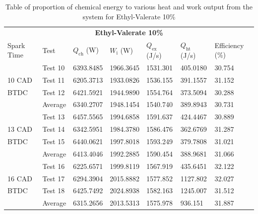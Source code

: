 \documentclass[11pt]{article}
\begin{document}
\begin{table}[H]
	\begin{center}
	\begin{tabular}{@{}l l l l l l l@{}}
		\toprule
		\multicolumn{7}{c}{\textbf{Ethyl-Valerate 10\%}}\\
		Spark Time & Test & $Q_\textrm{ch}$ (W) & $W_\textrm{i}$ (W) & $Q_\textrm{ex}$ (J/s) & $Q_\textrm{ht}$ (J/s) & Efficiency (\%)\\
		\midrule
				& Test 10  & 6393.8485 & 1966.3645 & 1531.301 & 405.0180 & 30.754\\
		10 CAD	& Test 11  & 6205.3713 & 1933.0826 & 1536.155 & 391.1557 & 31.152\\
		BTDC	& Test 12  & 6421.5921 & 1944.9890 & 1554.764 & 373.5094 & 30.288\\
				& Average  & 6340.2707 & 1948.1454 & 1540.740 & 389.8943 & 30.731\\
				& Test 13  & 6457.5565 & 1994.6858 & 1591.637 & 424.4467 & 30.889\\
		13 CAD	& Test 14  & 6342.5951 & 1984.3780 & 1586.476 & 362.6769 & 31.287\\
		BTDC	& Test 15  & 6440.0621 & 1997.8018 & 1593.249 & 379.7808 & 31.021\\
				& Average  & 6413.4046 & 1992.2885 & 1590.454 & 388.9681 & 31.066\\	
				& Test 16  & 6225.6571 & 1999.8119 & 1567.919 & 435.6451 & 32.122\\
		16 CAD	& Test 17  & 6294.3904 & 2015.8882 & 1577.852 & 1127.802 & 32.027\\
		BTDC	& Test 18  & 6425.7492 & 2024.8938 & 1582.163 & 1245.007 & 31.512\\
				& Average  & 6315.2656 & 2013.5313 & 1575.978 & 936.151 & 31.887\\		
		\bottomrule
	\end{tabular}
	\caption{Table of proportion of chemical energy to various heat and work output from the system for Ethyl-Valerate 10\%}
	\label{q4-t2}
	\end{center}
\end{table}
\end{document}
